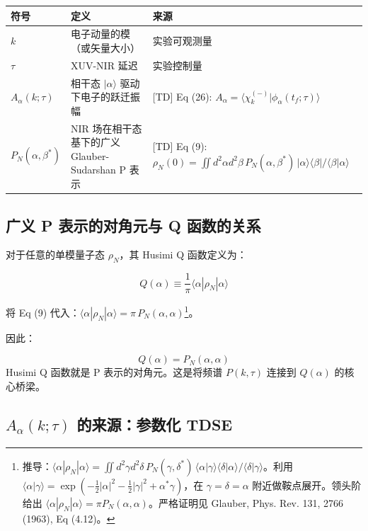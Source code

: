 \documentclass[12pt,a4paper]{ctexart}
\begin{document}
\begin{center}
\begin{tabular}{p{2cm}p{4.5cm}p{6cm}}
\toprule
\textbf{符号} & \textbf{定义} & \textbf{来源} \\
\midrule
$k$ & 电子动量的模（或矢量大小）& 实验可观测量 \\
$\tau$ & XUV-NIR 延迟 & 实验控制量 \\
$A_\alpha(k;\tau)$ & 相干态 $|\alpha\rangle$ 驱动下电子的跃迁振幅 & [TD] Eq (26): $A_\alpha = \langle\chi_k^{(-)}|\phi_\alpha(t_f;\tau)\rangle$ \\
$P_N(\alpha,\beta^*)$ & NIR 场在相干态基下的广义 Glauber-Sudarshan P 表示 & [TD] Eq (9): $\rho_N(0) = \iint d^2\alpha d^2\beta\, P_N(\alpha,\beta^*)\,|\alpha\rangle\langle\beta|/\langle\beta|\alpha\rangle$ \\
\bottomrule
\end{tabular}
\end{center}

\subsection{广义 P 表示的对角元与 Q 函数的关系}

对于任意的单模量子态 $\rho_N$，其 Husimi Q 函数定义为：

\begin{equation}\label{eq:Qdef}
Q(\alpha) \equiv \frac{1}{\pi}\langle\alpha|\rho_N|\alpha\rangle
\end{equation}

将 Eq (9) 代入：$\langle\alpha|\rho_N|\alpha\rangle = \pi \, P_N(\alpha,\alpha)$\footnote{推导：$\langle\alpha|\rho_N|\alpha\rangle = \iint d^2\gamma d^2\delta\,P_N(\gamma,\delta^*)\,\langle\alpha|\gamma\rangle\langle\delta|\alpha\rangle/\langle\delta|\gamma\rangle$。利用 $\langle\alpha|\gamma\rangle = \exp(-\frac12|\alpha|^2-\frac12|\gamma|^2+\alpha^*\gamma)$，在 $\gamma=\delta=\alpha$ 附近做鞍点展开。领头阶给出 $\langle\alpha|\rho_N|\alpha\rangle = \pi P_N(\alpha,\alpha)$。严格证明见 Glauber, Phys. Rev. 131, 2766 (1963), Eq (4.12)。}。

因此：

\begin{keybox}
\[
\boxed{Q(\alpha) = P_N(\alpha,\alpha)}
\]
Husimi Q 函数就是 P 表示的对角元。这是将频谱 $P(k,\tau)$ 连接到 $Q(\alpha)$ 的核心桥梁。
\end{keybox}

\subsection{$A_\alpha(k;\tau)$ 的来源：参数化 TDSE}
\end{document}
